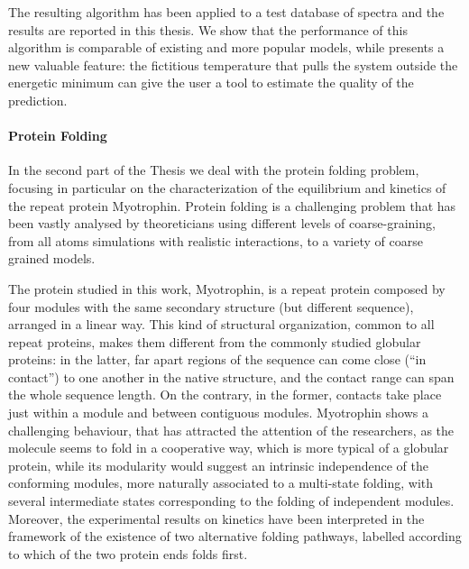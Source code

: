 The resulting algorithm has been applied to a test database of spectra and the results are
reported in this thesis. We show that the performance of this algorithm is
comparable of existing and more popular models, while presents a new valuable
feature: the fictitious temperature that pulls the system outside the energetic
minimum can give the user a tool to estimate the quality of the prediction.


\paragraph{Protein Folding}
In the second part of the Thesis we deal with  the protein folding problem,
focusing in particular on  the characterization of the equilibrium and kinetics
of the repeat protein Myotrophin.
Protein folding is a challenging problem that has been vastly analysed by
theoreticians %
using different levels of coarse-graining, %
from all atoms simulations
with realistic interactions, to a variety of coarse grained models.

The protein studied in this work, Myotrophin, is a repeat protein composed by
four modules with the same secondary structure (but different sequence), %
arranged in a linear way. This kind of structural organization, common to all
repeat proteins,  makes them different from the commonly  studied globular
proteins: in the latter, far apart regions of the sequence can come close (``in
contact'') to one another in the native structure, and the contact range can
span the whole sequence length. On the contrary, in the former, contacts take
place just within a module and between contiguous modules.
Myotrophin
shows a challenging behaviour, that has attracted  the attention of the researchers, as the molecule
seems to fold in a cooperative way, which is more typical of a globular protein, while %
its modularity would suggest an intrinsic independence of the conforming
modules, more naturally associated to a multi-state folding, with several
intermediate states corresponding to the folding of independent modules.
Moreover, the experimental results on kinetics have been interpreted in the
framework of the existence of  two alternative folding pathways, labelled
according to which of the two protein ends folds first.

